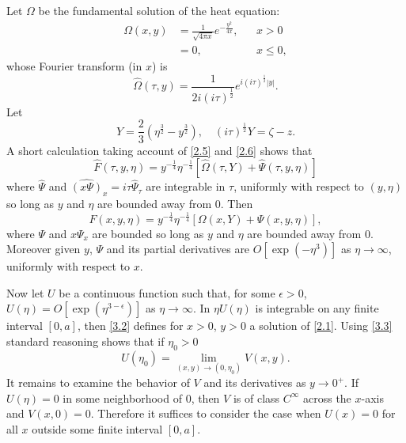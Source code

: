 \documentclass[leqno]{article}
\numberwithin{equation}{section}
\theoremstyle{plain}
\begin{document}
Let $\Omega$ be the fundamental solution of the heat equation:
\begin{align*}
	\Omega(x,y) & = \frac{1}{\sqrt{4\pi x}} e^{-\frac{y^2}{4x}}, && x > 0 \\
	& = 0, && x \leq 0,
\end{align*}
whose Fourier transform (in $x$) is
\begin{equation*}
	\hat{\Omega}(\tau,y) = \frac{1}{2i(i\tau)^{\frac 12}} e^{i(i\tau)^{\frac 12}|y|}.
\end{equation*}
Let
\begin{equation*}
	Y = \frac 2 3 \left(\eta^{\frac 32} - y^{\frac 32}\right), \quad (i\tau)^{\frac 12} Y = \zeta - z.
\end{equation*}
A short calculation taking account of \eqref{2.5} and \eqref{2.6} shows that
\begin{equation*}
	\hat{F}(\tau,y,\eta) = y^{-\frac 14} \eta^{-\frac 14} [ \hat{\Omega}(\tau,Y) + \hat{\Psi}(\tau,y,\eta) ]
\end{equation*}
where $\hat{\Psi}$ and $\widehat{(x\Psi)}_x = i\tau\hat{\Psi}_\tau$ are integrable in $\tau$, uniformly with respect to $(y,\eta)$ so long as $y$ and $\eta$ are bounded away from $0$.
Then
\begin{equation}
	\label{3.3}
	F(x,y,\eta) = y^{-\frac 14} \eta^{-\frac 14} [ \Omega(x,Y) + \Psi(x,y,\eta) ],
\end{equation}
where $\Psi$ and $x\Psi_x$ are bounded so long as $y$ and $\eta$ are bounded away from $0$.
Moreover given $y$, $\Psi$ and its partial derivatives are $O[\exp(-\eta^3)]$ as $\eta \to \infty$, uniformly with respect to $x$.

Now let $U$ be a continuous function such that, for some $\epsilon > 0$, $U(\eta) = O[\exp(\eta^{3-\epsilon})]$ as $\eta \to \infty$.
In $\eta U(\eta)$ is integrable on any finite interval $[0,a]$, then \eqref{3.2} defines for $x > 0$, $y > 0$ a solution of \eqref{2.1}.
Using \eqref{3.3} standard reasoning shows that if $\eta_0 > 0$
\begin{equation*}
	U(\eta_0) = \lim_{(x,y) \to (0,\eta_0)} V(x,y).
\end{equation*}
It remains to examine the behavior of $V$ and its derivatives as $y \to 0^+$.
If $U(\eta) = 0$ in some neighborhood of $0$, then $V$ is of class $C^\infty$ across the $x$-axis and $V(x,0)=0$.
Therefore it suffices to consider the case when $U(x) = 0$ for all $x$ outside some finite interval $[0,a]$.
\end{document}
